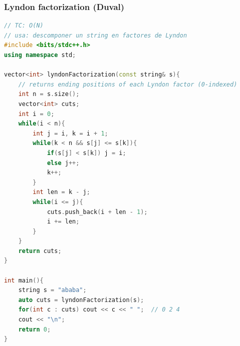 \subsubsection{Lyndon factorization (Duval)}
\begin{lstlisting}[style=mystyle, language=C++]
// TC: O(N)
// usa: descomponer un string en factores de Lyndon
#include <bits/stdc++.h>
using namespace std;

vector<int> lyndonFactorization(const string& s){
	// returns ending positions of each Lyndon factor (0-indexed)
	int n = s.size();
	vector<int> cuts;
	int i = 0;
	while(i < n){
		int j = i, k = i + 1;
		while(k < n && s[j] <= s[k]){
			if(s[j] < s[k]) j = i;
			else j++;
			k++;
		}
		int len = k - j;
		while(i <= j){
			cuts.push_back(i + len - 1);
			i += len;
		}
	}
	return cuts;
}

int main(){
	string s = "ababa";
	auto cuts = lyndonFactorization(s);
	for(int c : cuts) cout << c << " ";  // 0 2 4
	cout << "\n";
	return 0;
}
\end{lstlisting}
